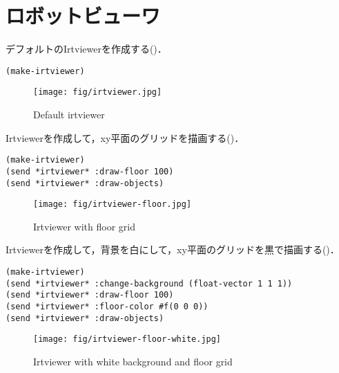 \section{ロボットビューワ}

デフォルトのIrtviewerを作成する()．
\begin{verbatim}
(make-irtviewer)
\end{verbatim}
\begin{figure}[htb]
  \begin{center}
    \texttt{[image: fig/irtviewer.jpg]}
    \caption{Default irtviewer}
  \end{center}
\end{figure}

Irtviewerを作成して，xy平面のグリッドを描画する()．
\begin{verbatim}
(make-irtviewer)
(send *irtviewer* :draw-floor 100)
(send *irtviewer* :draw-objects)
\end{verbatim}
\begin{figure}[htb]
  \begin{center}
    \texttt{[image: fig/irtviewer-floor.jpg]}
    \caption{Irtviewer with floor grid}
  \end{center}
\end{figure}

Irtviewerを作成して，背景を白にして，xy平面のグリッドを黒で描画する()．
\begin{verbatim}
(make-irtviewer)
(send *irtviewer* :change-background (float-vector 1 1 1))
(send *irtviewer* :draw-floor 100)
(send *irtviewer* :floor-color #f(0 0 0))
(send *irtviewer* :draw-objects)
\end{verbatim}
\begin{figure}[htb]
  \begin{center}
    \texttt{[image: fig/irtviewer-floor-white.jpg]}
    \caption{Irtviewer with white background and floor grid}
  \end{center}
\end{figure}



